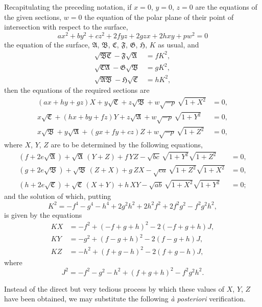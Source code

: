 \documentclass[11pt,a4paper]{book}
\begin{document}
Recapitulating the preceding notation, if $x=0$, $y=0$, $z=0$ are the equations of the given sections, $w=0$ the equation of the polar plane of their point of intersection with respect to the surface,
\[
ax^2+by^2+cz^2+2fyz+2gzx+2hxy+pw^2=0
\]
the equation of the surface, $\mathfrak{A}$, $\mathfrak{B}$, $\mathfrak{C}$, $\mathfrak{F}$, $\mathfrak{G}$, $\mathfrak{H}$, $K$ as usual, and
\begin{align*}
\sqrt{\mathfrak{B}\mathfrak{C}}-\mathfrak{F}\sqrt{\mathfrak{A}} &= fK^2,\\
\sqrt{\mathfrak{C}\mathfrak{A}}-\mathfrak{G}\sqrt{\mathfrak{B}} &= gK^2,\\
\sqrt{\mathfrak{A}\mathfrak{B}}-\mathfrak{H}\sqrt{\mathfrak{C}} &= hK^2,
\end{align*}
then the equations of the required sections are
\begin{align*}
(ax+hy+gz)X + y\sqrt{\mathfrak{C}} + z\sqrt{\mathfrak{B}} + w\sqrt{-p}\,\sqrt{1+X^2} &= 0,\\
x\sqrt{\mathfrak{C}} + (hx+by+fz)Y + z\sqrt{\mathfrak{A}} + w\sqrt{-p}\,\sqrt{1+Y^2} &= 0,\\
x\sqrt{\mathfrak{B}} + y\sqrt{\mathfrak{A}} + (gx+fy+cz)Z + w\sqrt{-p}\,\sqrt{1+Z^2} &= 0,
\end{align*}
where $X$, $Y$, $Z$ are to be determined by the following equations,
\begin{align*}
(f+2e\sqrt{\mathfrak{A}}) + \sqrt{\mathfrak{A}}\,(Y+Z) + f\,YZ - \sqrt{bc}\,\sqrt{1+Y^2}\sqrt{1+Z^2} &= 0,\\
(g+2e\sqrt{\mathfrak{B}}) + \sqrt{\mathfrak{B}}\,(Z+X) + g\,ZX - \sqrt{ca}\,\sqrt{1+Z^2}\sqrt{1+X^2} &= 0,\\
(h+2e\sqrt{\mathfrak{C}}) + \sqrt{\mathfrak{C}}\,(X+Y) + h\,XY - \sqrt{ab}\,\sqrt{1+X^2}\sqrt{1+Y^2} &= 0;
\end{align*}
and the solution of which, putting
\[
K^2 = -f^4-g^4-h^4+2g^2h^2+2h^2f^2+2f^2g^2-f^2g^2h^2,
\]
is given by the equations
\begin{align*}
KX &= -f^2 + (-f+g+h)^2 - 2(-f+g+h)J,\\
KY &= -g^2 + (f-g+h)^2 - 2(f-g+h)J,\\
KZ &= -h^2 + (f+g-h)^2 - 2(f+g-h)J,
\end{align*}
where
\[
J^2 = -f^2-g^2-h^2+(f+g+h)^2-f^2g^2h^2.
\]

Instead of the direct but very tedious process by which these values of $X$, $Y$, $Z$ have been obtained, we may substitute the following \textit{\`a posteriori} verification.
\end{document}
